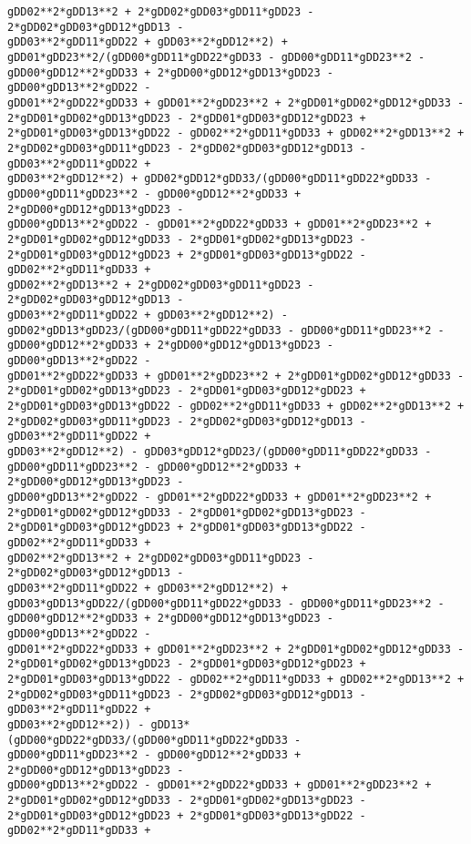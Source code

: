 \documentclass[landscape,letterpaper,10pt,english]{article}
\begin{document}
\begin{Verbatim}[commandchars=\\\{\}]
gDD02**2*gDD13**2 + 2*gDD02*gDD03*gDD11*gDD23 - 2*gDD02*gDD03*gDD12*gDD13 -
gDD03**2*gDD11*gDD22 + gDD03**2*gDD12**2) +
gDD01*gDD23**2/(gDD00*gDD11*gDD22*gDD33 - gDD00*gDD11*gDD23**2 -
gDD00*gDD12**2*gDD33 + 2*gDD00*gDD12*gDD13*gDD23 - gDD00*gDD13**2*gDD22 -
gDD01**2*gDD22*gDD33 + gDD01**2*gDD23**2 + 2*gDD01*gDD02*gDD12*gDD33 -
2*gDD01*gDD02*gDD13*gDD23 - 2*gDD01*gDD03*gDD12*gDD23 +
2*gDD01*gDD03*gDD13*gDD22 - gDD02**2*gDD11*gDD33 + gDD02**2*gDD13**2 +
2*gDD02*gDD03*gDD11*gDD23 - 2*gDD02*gDD03*gDD12*gDD13 - gDD03**2*gDD11*gDD22 +
gDD03**2*gDD12**2) + gDD02*gDD12*gDD33/(gDD00*gDD11*gDD22*gDD33 -
gDD00*gDD11*gDD23**2 - gDD00*gDD12**2*gDD33 + 2*gDD00*gDD12*gDD13*gDD23 -
gDD00*gDD13**2*gDD22 - gDD01**2*gDD22*gDD33 + gDD01**2*gDD23**2 +
2*gDD01*gDD02*gDD12*gDD33 - 2*gDD01*gDD02*gDD13*gDD23 -
2*gDD01*gDD03*gDD12*gDD23 + 2*gDD01*gDD03*gDD13*gDD22 - gDD02**2*gDD11*gDD33 +
gDD02**2*gDD13**2 + 2*gDD02*gDD03*gDD11*gDD23 - 2*gDD02*gDD03*gDD12*gDD13 -
gDD03**2*gDD11*gDD22 + gDD03**2*gDD12**2) -
gDD02*gDD13*gDD23/(gDD00*gDD11*gDD22*gDD33 - gDD00*gDD11*gDD23**2 -
gDD00*gDD12**2*gDD33 + 2*gDD00*gDD12*gDD13*gDD23 - gDD00*gDD13**2*gDD22 -
gDD01**2*gDD22*gDD33 + gDD01**2*gDD23**2 + 2*gDD01*gDD02*gDD12*gDD33 -
2*gDD01*gDD02*gDD13*gDD23 - 2*gDD01*gDD03*gDD12*gDD23 +
2*gDD01*gDD03*gDD13*gDD22 - gDD02**2*gDD11*gDD33 + gDD02**2*gDD13**2 +
2*gDD02*gDD03*gDD11*gDD23 - 2*gDD02*gDD03*gDD12*gDD13 - gDD03**2*gDD11*gDD22 +
gDD03**2*gDD12**2) - gDD03*gDD12*gDD23/(gDD00*gDD11*gDD22*gDD33 -
gDD00*gDD11*gDD23**2 - gDD00*gDD12**2*gDD33 + 2*gDD00*gDD12*gDD13*gDD23 -
gDD00*gDD13**2*gDD22 - gDD01**2*gDD22*gDD33 + gDD01**2*gDD23**2 +
2*gDD01*gDD02*gDD12*gDD33 - 2*gDD01*gDD02*gDD13*gDD23 -
2*gDD01*gDD03*gDD12*gDD23 + 2*gDD01*gDD03*gDD13*gDD22 - gDD02**2*gDD11*gDD33 +
gDD02**2*gDD13**2 + 2*gDD02*gDD03*gDD11*gDD23 - 2*gDD02*gDD03*gDD12*gDD13 -
gDD03**2*gDD11*gDD22 + gDD03**2*gDD12**2) +
gDD03*gDD13*gDD22/(gDD00*gDD11*gDD22*gDD33 - gDD00*gDD11*gDD23**2 -
gDD00*gDD12**2*gDD33 + 2*gDD00*gDD12*gDD13*gDD23 - gDD00*gDD13**2*gDD22 -
gDD01**2*gDD22*gDD33 + gDD01**2*gDD23**2 + 2*gDD01*gDD02*gDD12*gDD33 -
2*gDD01*gDD02*gDD13*gDD23 - 2*gDD01*gDD03*gDD12*gDD23 +
2*gDD01*gDD03*gDD13*gDD22 - gDD02**2*gDD11*gDD33 + gDD02**2*gDD13**2 +
2*gDD02*gDD03*gDD11*gDD23 - 2*gDD02*gDD03*gDD12*gDD13 - gDD03**2*gDD11*gDD22 +
gDD03**2*gDD12**2)) - gDD13*(gDD00*gDD22*gDD33/(gDD00*gDD11*gDD22*gDD33 -
gDD00*gDD11*gDD23**2 - gDD00*gDD12**2*gDD33 + 2*gDD00*gDD12*gDD13*gDD23 -
gDD00*gDD13**2*gDD22 - gDD01**2*gDD22*gDD33 + gDD01**2*gDD23**2 +
2*gDD01*gDD02*gDD12*gDD33 - 2*gDD01*gDD02*gDD13*gDD23 -
2*gDD01*gDD03*gDD12*gDD23 + 2*gDD01*gDD03*gDD13*gDD22 - gDD02**2*gDD11*gDD33 +

\end{Verbatim}
\end{document}
